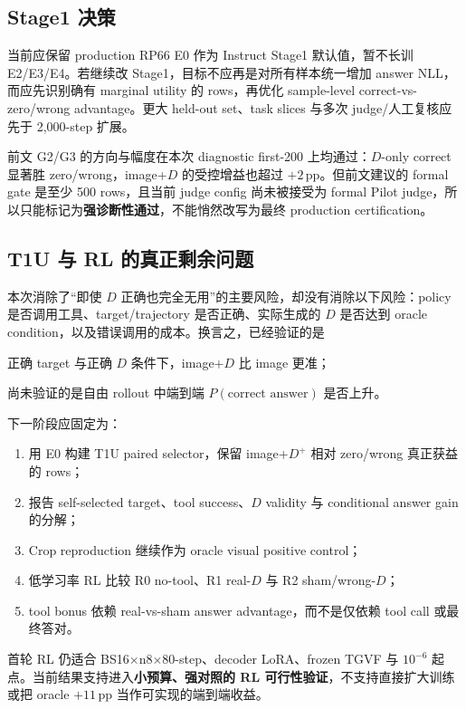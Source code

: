 \documentclass[UTF8,twocolumn,10pt,a4paper]{ctexart}
\newcommand{\Dpos}{D^{+}}
\newcommand{\pp}{\,\mathrm{pp}}
\begin{document}
\subsection{Stage1 决策}

当前应保留 production RP66 E0 作为 Instruct Stage1 默认值，暂不长训 E2/E3/E4。若继续改 Stage1，目标不应再是对所有样本统一增加 answer NLL，而应先识别确有 marginal utility 的 rows，再优化 sample-level correct-vs-zero/wrong advantage。更大 held-out set、task slices 与多次 judge/人工复核应先于 2,000-step 扩展。

前文 G2/G3 的方向与幅度在本次 diagnostic first-200 上均通过：$D$-only correct 显著胜 zero/wrong，image+$D$ 的受控增益也超过 $+2\pp$。但前文建议的 formal gate 是至少 500 rows，且当前 judge config 尚未被接受为 formal Pilot judge，所以只能标记为\textbf{强诊断性通过}，不能悄然改写为最终 production certification。

\subsection{T1U 与 RL 的真正剩余问题}

本次消除了“即使 $D$ 正确也完全无用”的主要风险，却没有消除以下风险：policy 是否调用工具、target/trajectory 是否正确、实际生成的 $D$ 是否达到 oracle condition，以及错误调用的成本。换言之，已经验证的是
\begin{center}
\small
正确 target 与正确 $D$ 条件下，image+$D$ 比 image 更准；
\end{center}
尚未验证的是自由 rollout 中端到端 $P(\text{correct answer})$ 是否上升。

下一阶段应固定为：
\begin{enumerate}
  \item 用 E0 构建 T1U paired selector，保留 image+$\Dpos$ 相对 zero/wrong 真正获益的 rows；
  \item 报告 self-selected target、tool success、$D$ validity 与 conditional answer gain 的分解；
  \item Crop reproduction 继续作为 oracle visual positive control；
  \item 低学习率 RL 比较 R0 no-tool、R1 real-$D$ 与 R2 sham/wrong-$D$；
  \item tool bonus 依赖 real-vs-sham answer advantage，而不是仅依赖 tool call 或最终答对。
\end{enumerate}

首轮 RL 仍适合 BS16$\times$n8$\times$80-step、decoder LoRA、frozen TGVF 与 $10^{-6}$ 起点。当前结果支持进入\textbf{小预算、强对照的 RL 可行性验证}，不支持直接扩大训练或把 oracle $+11\pp$ 当作可实现的端到端收益。
\end{document}
